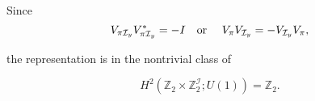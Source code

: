 Since
$$
V_{\mathcal{\pi} \mathcal{I}_y} V_{\mathcal{\pi} \mathcal{I}_y}^* = -I \text{\quad or \quad } V_{\mathcal{\pi}} V_{\mathcal{I}_y} = - V_{\mathcal{I}_y} V_{\mathcal{\pi}},
$$

the representation is in the nontrivial class of

$$
H^2(\mathbb{Z}_2 \times \mathbb{Z}_2^{\mathcal{I}}; U(1)) = \mathbb{Z}_2.
$$


